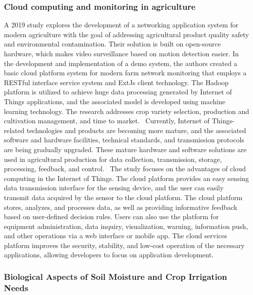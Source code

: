 \documentclass[11pt]{scrartcl} %
\begin{document}
\subsubsection{Cloud computing and monitoring in agriculture}
A 2019 study explores the development of a networking application system for modern agriculture with the goal of addressing agricultural product quality safety and environmental contamination. Their solution is built on open-source hardware, which makes video surveillance based on motion detection easier. In the development and implementation of a demo system, the authors created a basic cloud platform system for modern farm network monitoring that employs a RESTful interface service system and \gls{ExtJs} client technology. The \gls{Hadoop} platform is utilized to achieve huge data processing generated by Internet of Things applications, and the associated model is developed using machine learning technology. The research addresses crop variety selection, production and cultivation management, and time to market.~\parencite{cloud_computing_and_monitoring}
\newline Currently, Internet of Things-related technologies and products are becoming more mature, and the associated software and hardware facilities, technical standards, and transmission protocols are being gradually upgraded. These mature hardware and software solutions are used in agricultural production for data collection, transmission, storage, processing, feedback, and control.~\parencite{cloud_computing_and_monitoring}
\newline The study focuses on the advantages of cloud computing in the Internet of Things. The cloud platform provides an easy sensing data transmission interface for the sensing device, and the user can easily transmit data acquired by the sensor to the cloud platform. The cloud platform stores, analyzes, and processes data, as well as providing informative feedback based on user-defined decision rules. Users can also use the platform for equipment administration, data inquiry, visualization, warning, information push, and other operations via a web interface or mobile app. The cloud services platform improves the security, stability, and low-cost operation of the necessary applications, allowing developers to focus on application development.~\parencite{cloud_computing_and_monitoring}
\subsubsection{Biological Aspects of Soil Moisture and Crop Irrigation Needs}
\end{document}
